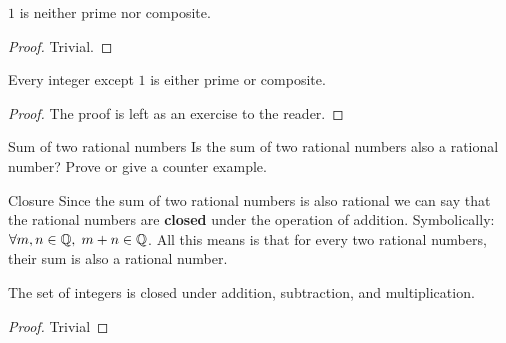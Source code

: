 \begin{thm}{}
    $1$ is neither prime nor composite.
    \begin{proof}
        Trivial.
    \end{proof}
\end{thm}

\begin{lma}{}
    Every integer except $1$ is either prime or composite. 
    \begin{proof}
        The proof is left as an exercise to the reader.
    \end{proof}
\end{lma}

\begin{question}{Sum of two rational numbers}{}
    Is the sum of two rational numbers also a rational number? Prove or give a counter example.
\end{question}

\begin{fact}{Closure}{}
 Since the sum of two rational numbers is also rational we can say that the rational numbers are \textbf{closed} under the operation of addition. Symbolically: $\forall m, n \in \mathbb Q, \hspace{0.1cm} m + n \in \mathbb Q$. All this means is that for every two rational numbers, their sum is also a rational number. 
\end{fact}

\begin{thm}{}{\label{thm:intclosure}}
    The set of integers is closed under addition, subtraction, and multiplication.
    \begin{proof}
        Trivial
    \end{proof}
\end{thm}


